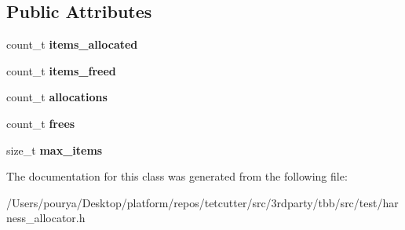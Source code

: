 \subsection*{Public Attributes}
\begin{DoxyCompactItemize}
\item 
\hypertarget{classlocal__counting__allocator_af6b917c870a7e17b76ee39cf4289b81e}{}count\+\_\+t {\bfseries items\+\_\+allocated}\label{classlocal__counting__allocator_af6b917c870a7e17b76ee39cf4289b81e}

\item 
\hypertarget{classlocal__counting__allocator_abfa2c4e469ab9364d95b8577af86f446}{}count\+\_\+t {\bfseries items\+\_\+freed}\label{classlocal__counting__allocator_abfa2c4e469ab9364d95b8577af86f446}

\item 
\hypertarget{classlocal__counting__allocator_a56bd5245a006a1aacb36181c360c904b}{}count\+\_\+t {\bfseries allocations}\label{classlocal__counting__allocator_a56bd5245a006a1aacb36181c360c904b}

\item 
\hypertarget{classlocal__counting__allocator_ac61b6e46b183a53da0abcb76c48611bb}{}count\+\_\+t {\bfseries frees}\label{classlocal__counting__allocator_ac61b6e46b183a53da0abcb76c48611bb}

\item 
\hypertarget{classlocal__counting__allocator_a79afdd13df8736f8547ef2a2a7c09164}{}size\+\_\+t {\bfseries max\+\_\+items}\label{classlocal__counting__allocator_a79afdd13df8736f8547ef2a2a7c09164}

\end{DoxyCompactItemize}


The documentation for this class was generated from the following file\+:\begin{DoxyCompactItemize}
\item 
/\+Users/pourya/\+Desktop/platform/repos/tetcutter/src/3rdparty/tbb/src/test/harness\+\_\+allocator.\+h\end{DoxyCompactItemize}
